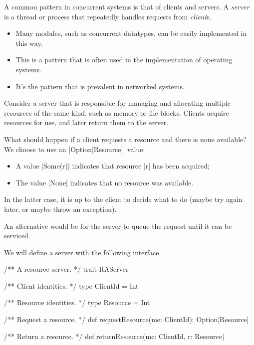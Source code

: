 
\begin{slide}

A common pattern in concurrent systems is that of clients and servers.  A
\emph{server} is a thread or process that repeatedly handles requests from
\emph{client}s.
%
\begin{itemize}
\item Many modules, such as concurrent datatypes, can be easily implemented in
this way.

\item This is a pattern that is often used in the implementation of operating
systems.

\item It's the pattern that is prevalent in networked systems.
\end{itemize}
\end{slide}


\begin{slide}

Consider a server that is responsible for managing and allocating multiple
resources of the same kind, such as memory or file blocks.  Clients acquire
resources for use, and later return them to the server.

What should happen if a client requests a resource and there is none
available?  We choose to use an |Option[Resource]| value:
%
\begin{itemize}
\item A value |Some(r)| indicates that resource |r| has been acquired;

\item The value |None| indicates that no resource was available.
\end{itemize}
%
In the latter case, it is up to the client to decide what to do (maybe try
again later, or maybe throw an exception).

An alternative would be for the server to queue the request until it can be
serviced. 
\end{slide}


\begin{slide}

We will define a server with the following interface. 
%
\begin{scala}
/** A resource server. */
trait RAServer{
  /** Client identities. */
  type ClientId = Int

  /** Resource identities. */
  type Resource = Int

  /** Request a resource. */
  def requestResource(me: ClientId): Option[Resource]

  /** Return a resource. */
  def returnResource(me: ClientId, r: Resource) 
} 
\end{scala}
\end{slide}

